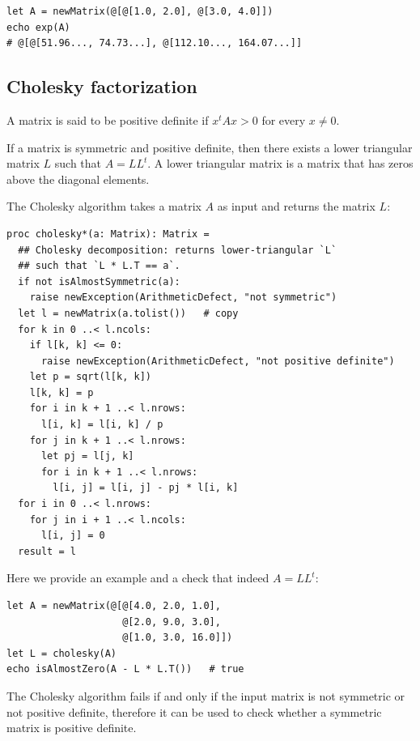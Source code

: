 \documentclass[justified, sixbynine]{tufte-book}
\def\ft{\small\tt}
\theoremstyle{plain}%
\newtheorem * {corollary}{Corollary}
\theoremstyle{definition}
\theoremstyle{remark}
\newtheorem * {remark}{Remark}
\newtheorem * {note}{Note}
\begin{document}
\begin{fullwidth}
\begin{lstlisting}
let A = newMatrix(@[@[1.0, 2.0], @[3.0, 4.0]])
echo exp(A)
# @[@[51.96..., 74.73...], @[112.10..., 164.07...]]
\end{lstlisting}

\goodbreak\subsection{Cholesky factorization}


A matrix is said to be positive definite if $x^t Ax>0$ for every $x\neq0$.

If a matrix is symmetric and positive definite, then there exists a lower triangular matrix $L$ such that $A=L L^t$. A lower triangular matrix is a matrix that has zeros above the diagonal elements.

The Cholesky algorithm takes a matrix $A$ as input and returns the matrix $L$:

\begin{lstlisting}[caption={in file: {\ft nlib/linalg.nim}}]
proc cholesky*(a: Matrix): Matrix =
  ## Cholesky decomposition: returns lower-triangular `L`
  ## such that `L * L.T == a`.
  if not isAlmostSymmetric(a):
    raise newException(ArithmeticDefect, "not symmetric")
  let l = newMatrix(a.tolist())   # copy
  for k in 0 ..< l.ncols:
    if l[k, k] <= 0:
      raise newException(ArithmeticDefect, "not positive definite")
    let p = sqrt(l[k, k])
    l[k, k] = p
    for i in k + 1 ..< l.nrows:
      l[i, k] = l[i, k] / p
    for j in k + 1 ..< l.nrows:
      let pj = l[j, k]
      for i in k + 1 ..< l.nrows:
        l[i, j] = l[i, j] - pj * l[i, k]
  for i in 0 ..< l.nrows:
    for j in i + 1 ..< l.ncols:
      l[i, j] = 0
  result = l
\end{lstlisting}

Here we provide an example and a check that indeed $A=L L^t$:

\begin{lstlisting}
let A = newMatrix(@[@[4.0, 2.0, 1.0],
                    @[2.0, 9.0, 3.0],
                    @[1.0, 3.0, 16.0]])
let L = cholesky(A)
echo isAlmostZero(A - L * L.T())   # true
\end{lstlisting}

The Cholesky algorithm fails if and only if the input matrix is not symmetric or not positive definite, therefore it can be used to check whether a symmetric matrix is positive definite.


\end{fullwidth}
\end{document}
